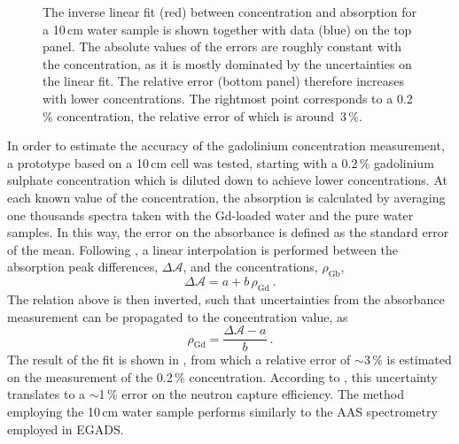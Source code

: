 \begin{figure}
	\centering
	\resizebox{0.8\textwidth}{!}{}
	\caption[Linear fit between Gd concentration and absorption with a 10\,cm water sample]%
		{The inverse linear fit (red) between concentration and absorption for a 10\,cm water sample %
		is shown together with data (blue) on the top panel.
		The absolute values of the errors are roughly constant with the concentration, %
		as it is mostly dominated by the uncertainties on the linear fit.
		The relative error (bottom panel) therefore increases with lower concentrations.
		The rightmost point corresponds to a 0.2\,\% concentration, the relative error %
		of which is around~3\,\%.}
	\label{fig:gad_10cm}
\end{figure}


In order to estimate the accuracy of the gadolinium concentration measurement, %
a prototype based on a 10\,cm cell was tested, starting with a 0.2\,\% gadolinium sulphate concentration %
which is diluted down to achieve lower concentrations.
At each known value of the concentration, the absorption is calculated by averaging one thousands spectra %
taken with the Gd-loaded water and the pure water samples.
In this way, the error on the absorbance is defined as the standard error of the mean.
Following , a linear interpolation is performed between the absorption peak differences, %
$\Delta \mathcal{A}$, and the concentrations, $\rho_\text{Gb}$, 
\begin{equation}
	\Delta \mathcal{A} = a + b\,\rho_\text{Gd}\ .
\end{equation}
The relation above is then inverted, such that uncertainties from the absorbance measurement %
can be propagated to the concentration value, as
\begin{equation}
	\rho_\text{Gd} = \frac{\Delta \mathcal{A} - a}{b}\ .
\end{equation}
The result of the fit is shown in , from which a relative error of $\sim$3\,\% %
is estimated on the measurement of the 0.2\,\% concentration.
According to , this uncertainty translates to a $\sim$1\,\% error on the neutron capture efficiency.
The method employing the 10\,cm water sample performs similarly to the AAS spectrometry employed in EGADS.


